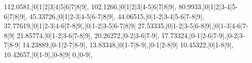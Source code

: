 
112.0581,|0|1|2|3|4|5|6|7|8|9|,
102.1266,|0|1|2|3|4-5|6|7|8|9|,
80.9933,|0|1|2|3-4|5-6|7|8|9|,
45.33726,|0|1|2-3|4-5|6-7|8|9|,
44.06515,|0|1-2|3-4|5-6|7-8|9|,
37.77619,|0|1|2-3|4-6|7-8|9|,|0|1-2|3-5|6-7|8|9|
27.53335,|0|1-2|3-5|6-8|9|,|0|1-3|4-6|7-8|9|
21.85774,|0|1-2|3-6|7-8|9|,
20.26272,|0-2|3-6|7-9|,
17.73324,|0-1|2-6|7-9|,|0-2|3-7|8-9|
14.23889,|0-1|2-7|8-9|,
13.83348,|0|1-7|8-9|,|0-1|2-8|9|
10.45322,|0|1-8|9|,
10.42657,|0|1-9|,|0-8|9|
0,|0-9|,
